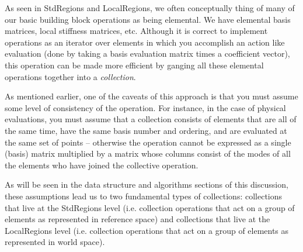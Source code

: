 As seen in StdRegions and LocalRegions, we often conceptually thing of many of our basic building block operations as being elemental.  We have 
elemental basis matrices, local stiffness matrices, etc.  Although it is correct to implement operations as an iterator over elements in which you accomplish
an action like evaluation (done by taking a basis evaluation matrix times a coefficient vector), this operation can be made more efficient by ganging all these
elemental operations together into a {\em collection}.  

As mentioned earlier, one of the caveats of this approach is that you must assume some level of consistency of the operation.  For instance, in the case of physical evaluations, you must assume that a collection consists of elements that are all of the same time, have the same basis number and ordering, and are evaluated at the same set of points -- otherwise the operation cannot be expressed as a single (basis) matrix multiplied by a matrix whose columns consist of the modes
of all the elements who have joined the collective operation.

As will be seen in the data structure and algorithms sections of this discussion, these assumptions lead us to two fundamental types of collections:  collections that live at the StdRegions level (i.e. collection operations that act on a group of elements as represented in reference space) and collections that live at the LocalRegions level (i.e. collection operations that act on a group of elements as represented in world space).